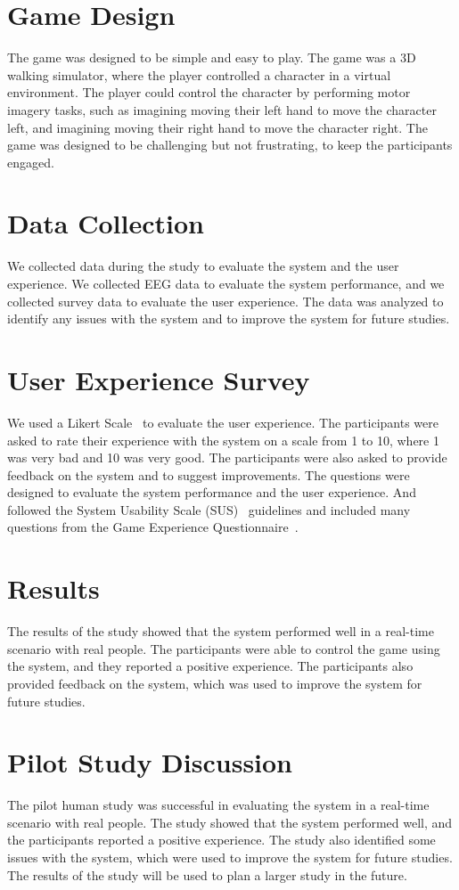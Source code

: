 \section{Game Design}
The game was designed to be simple and easy to play.
The game was a 3D walking simulator, where the player controlled a character in a virtual environment.
The player could control the character by performing motor imagery tasks, such as imagining moving their left hand to move the character left, and imagining moving their right hand to move the character right.
The game was designed to be challenging but not frustrating, to keep the participants engaged.

\section{Data Collection}
We collected data during the study to evaluate the system and the user experience.
We collected EEG data to evaluate the system performance, and we collected survey data to evaluate the user experience.
The data was analyzed to identify any issues with the system and to improve the system for future studies.

\section{User Experience Survey}
We used a Likert Scale~\cite{likert1932technique} to evaluate the user experience.
The participants were asked to rate their experience with the system on a scale from 1 to 10, where 1 was very bad and 10 was very good.
The participants were also asked to provide feedback on the system and to suggest improvements.
The questions were designed to evaluate the system performance and the user experience.
And followed the System Usability Scale (SUS)~\cite{brooke1996sus} guidelines and included many questions from the Game Experience Questionnaire~\cite{ijsselsteijn2013game}.

\section{Results}
The results of the study showed that the system performed well in a real-time scenario with real people.
The participants were able to control the game using the system, and they reported a positive experience.
The participants also provided feedback on the system, which was used to improve the system for future studies.

\section{Pilot Study Discussion}
The pilot human study was successful in evaluating the system in a real-time scenario with real people.
The study showed that the system performed well, and the participants reported a positive experience.
The study also identified some issues with the system, which were used to improve the system for future studies.
The results of the study will be used to plan a larger study in the future.
